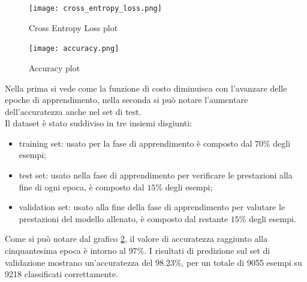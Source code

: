 \begin{figure}
    \centering
    \texttt{[image: cross\_entropy\_loss.png]}
    \caption{Cross Entropy Loss plot}
    \label{fig:cross_entropy_loss_plot}
\end{figure}

\begin{figure}
    \centering
    \texttt{[image: accuracy.png]}
    \caption{Accuracy plot}
    \label{fig:accuracy_plot}
\end{figure}
Nella prima si vede come la funzione di costo diminuisca con l'avanzare delle epoche di apprendimento, nella seconda si può notare l'aumentare dell'accuratezza anche nel set di test.\\
Il dataset è stato suddiviso in tre insiemi disgiunti:
\begin{itemize}
    \item training set: usato per la fase di apprendimento è composto dal $70\%$ degli esempi;
    \item test set: usato nella fase di apprendimento per verificare le prestazioni alla fine di ogni epoca, è composto dal $15\%$ degli esempi;
    \item validation set: usato alla fine della fase di apprendimento per valutare le prestazioni del modello allenato, è composto dal restante $15\%$ degli esempi.
\end{itemize}
Come si può notare dal grafico \ref{fig:accuracy_plot}, il valore di accuratezza raggiunto alla cinquantesima epoca è intorno al $97\%$. I risultati di predizione sul set di validazione mostrano un'accuratezza del $98.23\%$, per un totale di 9055 esempi su 9218 classificati correttamente.

